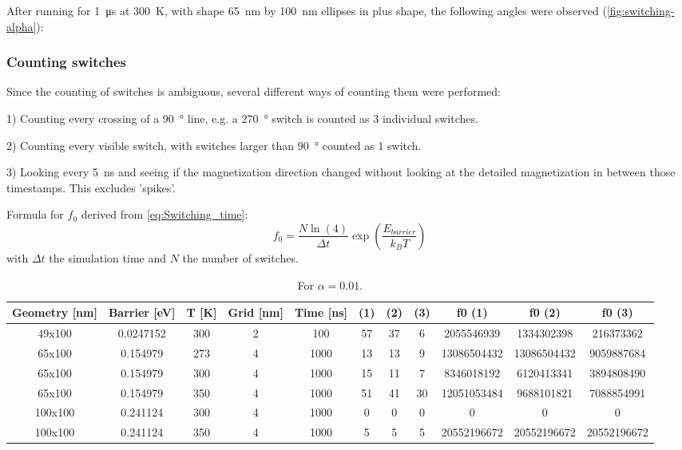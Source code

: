 \documentclass[10pt,a4paper]{article}
\begin{document}
After running for \SI{1}{\micro\second} at \SI{300}{\kelvin}, with shape \SI{65}{\nano\metre} by \SI{100}{\nano\metre} ellipses in plus shape, the following angles were observed (\cref{fig:switching-alpha}):


\subsubsection{Counting switches}
Since the counting of switches is ambiguous, several different ways of counting them were performed:

1) Counting every crossing of a \SI{90}{\degree} line, e.g. a \SI{270}{\degree} switch is counted as 3 individual switches.

2) Counting every visible switch, with switches larger than \SI{90}{\degree} counted as 1 switch.

3) Looking every \SI{5}{\nano\second} and seeing if the magnetization direction changed without looking at the detailed magnetization in between those timestamps. This excludes 'spikes'.

Formula for $f_0$ derived from \eqref{eq:Switching_time}:
\begin{equation*}
    f_0 = \frac{N \ln(4)}{\Delta t} \exp(\frac{E_{barrier}}{k_B T})
\end{equation*}
with $\Delta t$ the simulation time and $N$ the number of switches.

\begin{table}[b!]
    \centering
    \begin{tabular}{c|c|c|c|c|c|c|c|c|c|c}
        Geometry [nm] & Barrier [eV] & T [K] & Grid [nm] & Time [ns] & (1) & (2) & (3) & f0 (1) & f0 (2) & f0 (3) \\
        \hline
        49x100 & 0.0247152 & 300 & 2 & 100 & 57 & 37 & 6 & 2055546939 & 1334302398 & 216373362 \\
        \hline
        65x100 & 0.154979 & 273 & 4 & 1000 & 13 & 13 & 9 & 13086504432 & 13086504432 & 9059887684 \\
        65x100 & 0.154979 & 300 & 4 & 1000 & 15 & 11 & 7 & 8346018192 & 6120413341 & 3894808490 \\
        65x100 & 0.154979 & 350 & 4 & 1000 & 51 & 41 & 30 & 12051053484 & 9688101821 & 7088854991 \\
        \hline
        100x100 & 0.241124 & 300 & 4 & 1000 & 0 & 0 & 0 & 0 & 0 & 0 \\
        100x100 & 0.241124 & 350 & 4 & 1000 & 5 & 5 & 5 & 20552196672 & 20552196672 & 20552196672 
    \end{tabular}
    \caption{For $\alpha=0.01$.}
    \label{tab:switching-summary}
\end{table}
\end{document}
